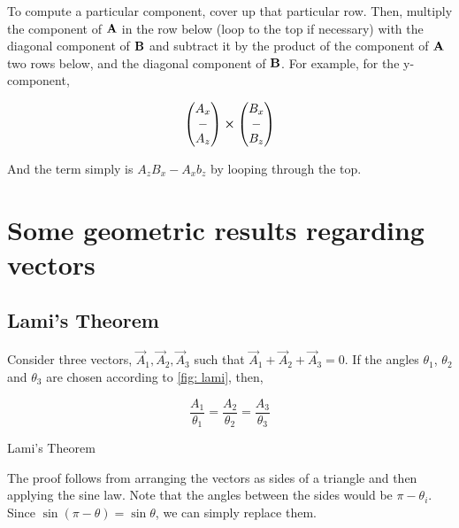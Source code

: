 To compute a particular component, cover up that particular row. Then, multiply the component 
of \(\boldsymbol{\mathbf{A}}\) in the row below (loop to the top if necessary) 
with the diagonal component of \(\boldsymbol{\mathbf{B}}\) and
subtract it by the product of the component of \(\boldsymbol{\mathbf{A}}\) two rows below, and the
diagonal component of \(\boldsymbol{\mathbf{B}}\). For example, for the y-component,

\[
\begin{pmatrix}
    A_x \\
    - \\
    A_z
\end{pmatrix} \cp
%
\begin{pmatrix}
    B_x \\
    - \\
    B_z
\end{pmatrix}
%
\]

And the term simply is \(A_zB_x - A_xb_z\) by looping through the top.

\section{Some geometric results regarding vectors}

\subsection{Lami's Theorem}

Consider three vectors, \(\vec{A}_1, \vec{A}_2, \vec{A}_3\) such that 
\(\vec{A}_1 + \vec{A}_2 + \vec{A}_3 = 0\). If the angles \(\theta_1\), \(\theta_2\)
and \(\theta_3\) are chosen according to \cref{fig: lami}, then,

\begin{theorem}
    \begin{equation*}
        \frac{A_1}{\theta_1} = \frac{A_2}{\theta_2} = \frac{A_3}{\theta_3}
    \end{equation*}
\end{theorem}

\begin{marginfigure}
    \centering
    \caption{Lami's Theorem}
    \label{fig: lami}
\end{marginfigure}

The proof follows from arranging the vectors as sides of a triangle and then applying the 
sine law. Note that the angles between the sides would be \(\pi - \theta_i\). Since 
\(\sin(\pi-\theta) = \sin\theta\), we can simply replace them. 

